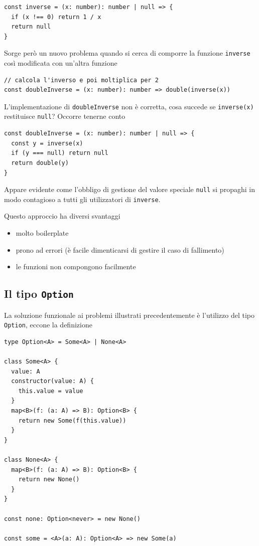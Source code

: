 \documentclass[12pt]{article}
\begin{document}
\begin{verbatim}
const inverse = (x: number): number | null => {
  if (x !== 0) return 1 / x
  return null
}
\end{verbatim}

Sorge però un nuovo problema quando si cerca di comporre la funzione \texttt{inverse} così modificata con un'altra funzione

\begin{verbatim}
// calcola l'inverso e poi moltiplica per 2
const doubleInverse = (x: number): number => double(inverse(x))
\end{verbatim}

L'implementazione di \texttt{doubleInverse} non è corretta, cosa succede se \texttt{inverse(x)} restituisce \texttt{null}?
Occorre tenerne conto

\begin{verbatim}
const doubleInverse = (x: number): number | null => {
  const y = inverse(x)
  if (y === null) return null
  return double(y)
}
\end{verbatim}

Appare evidente come l'obbligo di gestione del valore speciale \texttt{null} si propaghi in modo contagioso
a tutti gli utilizzatori di \texttt{inverse}.

Questo approccio ha diversi svantaggi

\begin{itemize}
  \item molto boilerplate
  \item prono ad errori (è facile dimenticarsi di gestire il caso di fallimento)
  \item le funzioni non compongono facilmente
\end{itemize}

\subsection{Il tipo \texttt{Option}}

La soluzione funzionale ai problemi illustrati precedentemente è l'utilizzo del tipo \texttt{Option},
eccone la definizione

\begin{verbatim}
type Option<A> = Some<A> | None<A>

class Some<A> {
  value: A
  constructor(value: A) {
    this.value = value
  }
  map<B>(f: (a: A) => B): Option<B> {
    return new Some(f(this.value))
  }
}

class None<A> {
  map<B>(f: (a: A) => B): Option<B> {
    return new None()
  }
}

const none: Option<never> = new None()

const some = <A>(a: A): Option<A> => new Some(a)
\end{verbatim}
\end{document}
